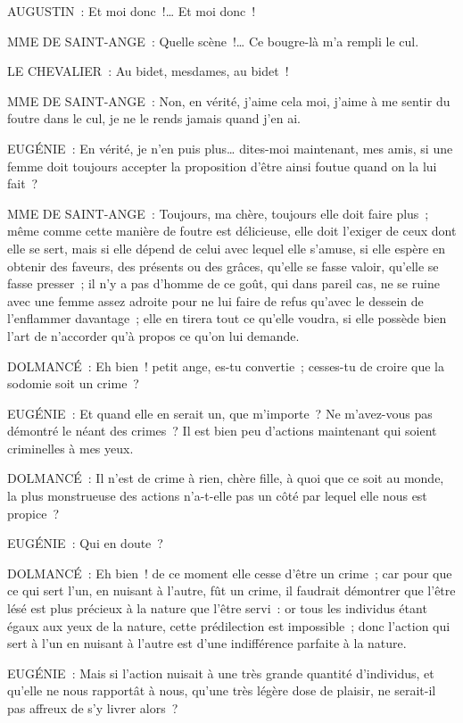 \documentclass[french,twoside]{book} %
\begin{document}
AUGUSTIN : Et moi donc !… Et moi donc !\par
MME DE SAINT-ANGE : Quelle scène !… Ce bougre-là m’a rempli le cul.\par
LE CHEVALIER : Au bidet, mesdames, au bidet !\par
MME DE SAINT-ANGE : Non, en vérité, j’aime cela moi, j’aime à me sentir du foutre dans le cul, je ne le rends jamais quand j’en ai.\par
EUGÉNIE : En vérité, je n’en puis plus… dites-moi maintenant, mes amis, si une femme doit toujours accepter la proposition d’être ainsi foutue quand on la lui fait ?\par
MME DE SAINT-ANGE : Toujours, ma chère, toujours elle doit faire plus ; même comme cette manière de foutre est délicieuse, elle doit l’exiger de ceux dont elle se sert, mais si elle dépend de celui avec lequel elle s’amuse, si elle espère en obtenir des faveurs, des présents ou des grâces, qu’elle se fasse valoir, qu’elle se fasse presser ; il n’y a pas d’homme de ce goût, qui dans pareil cas, ne se ruine avec une femme assez adroite pour ne lui faire de refus qu’avec le dessein de l’enflammer davantage ; elle en tirera tout ce qu’elle voudra, si elle possède bien l’art de n’accorder qu’à propos ce qu’on lui demande.\par
DOLMANCÉ : Eh bien ! petit ange, es-tu convertie ; cesses-tu de croire que la sodomie soit un crime ?\par
EUGÉNIE : Et quand elle en serait un, que m’importe ? Ne m’avez-vous pas démontré le néant des crimes ? Il est bien peu d’actions maintenant qui soient criminelles à mes yeux.\par
DOLMANCÉ : Il n’est de crime à rien, chère fille, à quoi que ce soit au monde, la plus monstrueuse des actions n’a-t-elle pas un côté par lequel elle nous est propice ?\par
EUGÉNIE : Qui en doute ?\par
DOLMANCÉ : Eh bien ! de ce moment elle cesse d’être un crime ; car pour que ce qui sert l’un, en nuisant à l’autre, fût un crime, il faudrait démontrer que l’être lésé est plus précieux à la nature que l’être servi : or tous les individus étant égaux aux yeux de la nature, cette prédilection est impossible ; donc l’action qui sert à l’un en nuisant à l’autre est d’une indifférence parfaite à la nature.\par
EUGÉNIE : Mais si l’action nuisait à une très grande quantité d’individus, et qu’elle ne nous rapportât à nous, qu’une très légère dose de plaisir, ne serait-il pas affreux de s’y livrer alors ?\par
\end{document}
